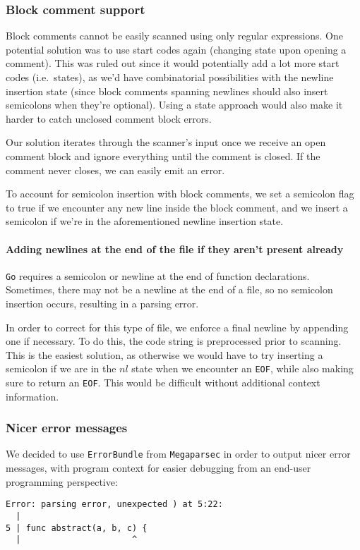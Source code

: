 \documentclass[11pt]{article}
\begin{document}
\subsubsection{Block comment support}
Block comments cannot be easily scanned using only regular
expressions. One potential solution was to use start codes again
(changing state upon opening a comment). This was ruled out since
it would potentially add a lot more start codes (i.e.\ states), as
we'd have combinatorial possibilities with the newline insertion state
(since block comments spanning newlines should also insert semicolons
when they're optional). Using a state approach would also make it
harder to catch unclosed comment block errors.

Our solution iterates through the scanner's input once we receive an
open comment block and ignore everything until the comment is closed.
If the comment never closes, we can easily emit an error.

To account for semicolon insertion with block comments, we set a
semicolon flag to true if we encounter any new line inside the
block comment, and we insert a semicolon if we're in the
aforementioned newline insertion state.
\paragraph{Adding newlines at the end of the file if they aren't present already}
\texttt{Go} requires a semicolon or newline at the end of function
declarations. Sometimes, there may not be a newline at the end of
a file, so no semicolon insertion occurs, resulting in a parsing error.

In order to correct for this type of file, we enforce a final
newline by appending one if necessary. To do this, the code string
is preprocessed prior to scanning. This is the easiest solution,
as otherwise we would have to try inserting a semicolon if we are in
the \(nl\) state when we encounter an \texttt{EOF}, while also making sure
to return an \texttt{EOF}. This would be difficult without additional
context information.
\subsubsection{Nicer error messages}
We decided to use \texttt{ErrorBundle} from \texttt{Megaparsec} in order to
output nicer error messages, with program context for easier
debugging from an end-user programming perspective:

\begin{verbatim}
Error: parsing error, unexpected ) at 5:22:
  |
5 | func abstract(a, b, c) {
  |                      ^
\end{verbatim}
\end{document}
